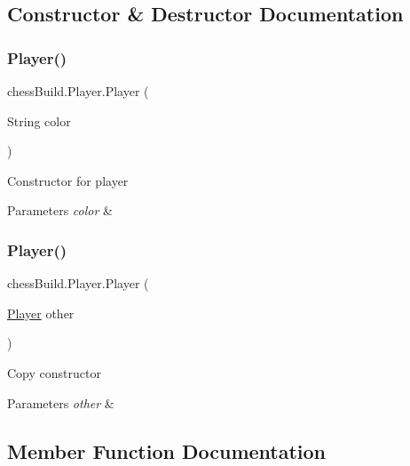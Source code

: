 \subsection{Constructor \& Destructor Documentation}
\mbox{\label{classchess_build_1_1_player_af6d8214f5ad0c21e5801c920aa1449db}} 
\subsubsection{\texorpdfstring{Player()}{Player()}\hspace{0.1cm}{\footnotesize\ttfamily [1/2]}}
{\footnotesize\ttfamily chess\+Build.\+Player.\+Player (\begin{DoxyParamCaption}\item[{String}]{color }\end{DoxyParamCaption})}

Constructor for player 
\begin{DoxyParams}{Parameters}
{\em color} & \\
\hline
\end{DoxyParams}
\mbox{\label{classchess_build_1_1_player_a427c6aeab40552829c8d387b8908c1a1}} 
\subsubsection{\texorpdfstring{Player()}{Player()}\hspace{0.1cm}{\footnotesize\ttfamily [2/2]}}
{\footnotesize\ttfamily chess\+Build.\+Player.\+Player (\begin{DoxyParamCaption}\item[{\hyperlink{classchess_build_1_1_player}{Player}}]{other }\end{DoxyParamCaption})}

Copy constructor 
\begin{DoxyParams}{Parameters}
{\em other} & \\
\hline
\end{DoxyParams}


\subsection{Member Function Documentation}
\mbox{\label{classchess_build_1_1_player_a2d04858909da7c3313939ab657c7541b}} 
